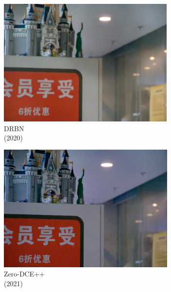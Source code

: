 \documentclass[a4paper, 10pt]{article}
\begin{document}
\begin{figure}[htbp]
\begin{subfigure}{0.17\columnwidth}
			\includegraphics[width=\linewidth]{picture/LLIE/VE-LOL-L/DRBN}
			\captionsetup{font=scriptsize}
			\caption*{DRBN \\ (2020)}
			\label{fig: DRBN_VE_LOL}	
		\end{subfigure}
		\begin{subfigure}{0.17\columnwidth}
			\includegraphics[width=\linewidth]{picture/LLIE/VE-LOL-L/Zero-DCE++}
			\captionsetup{font=scriptsize}
			\caption*{Zero-DCE++ \\ (2021)}
			\label{fig: Zero-DCE++}	
		\end{subfigure}
		\begin{subfigure}{0.17\columnwidth}

\end{subfigure}
\end{figure}
\end{document}
